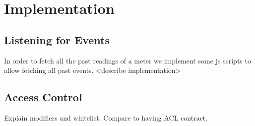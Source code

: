 \chapter{Implementation}

\section{Listening for Events} \label{apx:implementation:events}

In order to fetch all the past readings of a meter we implement some js scripts to allow fetching all past events. <describe implementation>


\section{Access Control}\label{apx:implementation:acl}
Explain modifiers and whitelist. Compare to having ACL contract.